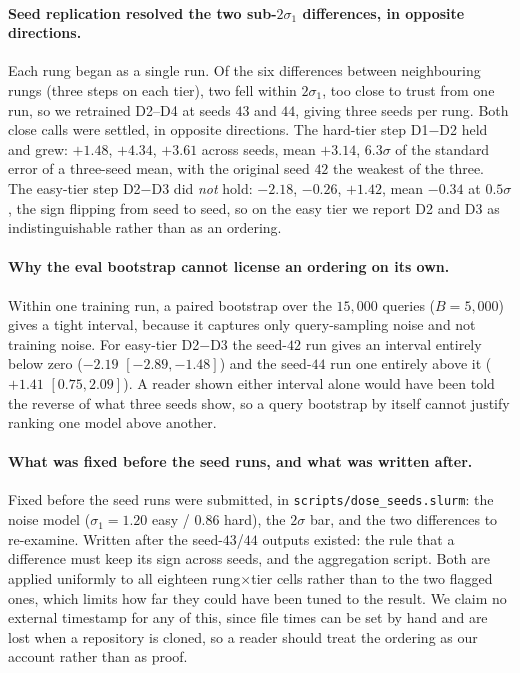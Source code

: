 \paragraph{Seed replication resolved the two sub-$2\sigma_1$ differences, in opposite directions.}
Each rung began as a single run. Of the six differences between neighbouring rungs (three steps on each tier), two fell within $2\sigma_1$, too close to trust from one run, so we retrained D2--D4 at seeds $43$ and $44$, giving three seeds per rung. Both close calls were settled, in opposite directions. The hard-tier step D1$-$D2 held and grew: $+1.48$, $+4.34$, $+3.61$ across seeds, mean $+3.14$, $6.3\sigma$ of the standard error of a three-seed mean, with the original seed $42$ the weakest of the three. The easy-tier step D2$-$D3 did \emph{not} hold: $-2.18$, $-0.26$, $+1.42$, mean $-0.34$ at $0.5\sigma$, the sign flipping from seed to seed, so on the easy tier we report D2 and D3 as indistinguishable rather than as an ordering.

\paragraph{Why the eval bootstrap cannot license an ordering on its own.}
Within one training run, a paired bootstrap over the $15{,}000$ queries ($B = 5{,}000$) gives a tight interval, because it captures only query-sampling noise and not training noise. For easy-tier D2$-$D3 the seed-$42$ run gives an interval entirely below zero ($-2.19$ $[-2.89, -1.48]$) and the seed-$44$ run one entirely above it ($+1.41$ $[0.75, 2.09]$). A reader shown either interval alone would have been told the reverse of what three seeds show, so a query bootstrap by itself cannot justify ranking one model above another.

\paragraph{What was fixed before the seed runs, and what was written after.}
Fixed before the seed runs were submitted, in \texttt{scripts/dose\_seeds.slurm}: the noise model ($\sigma_1 = 1.20$ easy / $0.86$ hard), the $2\sigma$ bar, and the two differences to re-examine. Written after the seed-$43$/$44$ outputs existed: the rule that a difference must keep its sign across seeds, and the aggregation script. Both are applied uniformly to all eighteen rung${\times}$tier cells rather than to the two flagged ones, which limits how far they could have been tuned to the result. We claim no external timestamp for any of this, since file times can be set by hand and are lost when a repository is cloned, so a reader should treat the ordering as our account rather than as proof.

